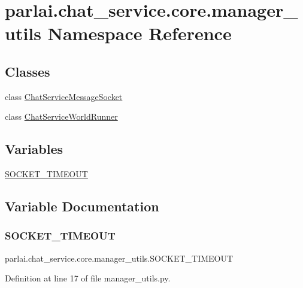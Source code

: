 \hypertarget{namespaceparlai_1_1chat__service_1_1core_1_1manager__utils}{}\section{parlai.\+chat\+\_\+service.\+core.\+manager\+\_\+utils Namespace Reference}
\label{namespaceparlai_1_1chat__service_1_1core_1_1manager__utils}
\subsection*{Classes}
\begin{DoxyCompactItemize}
\item 
class \hyperlink{classparlai_1_1chat__service_1_1core_1_1manager__utils_1_1ChatServiceMessageSocket}{Chat\+Service\+Message\+Socket}
\item 
class \hyperlink{classparlai_1_1chat__service_1_1core_1_1manager__utils_1_1ChatServiceWorldRunner}{Chat\+Service\+World\+Runner}
\end{DoxyCompactItemize}
\subsection*{Variables}
\begin{DoxyCompactItemize}
\item 
\hyperlink{namespaceparlai_1_1chat__service_1_1core_1_1manager__utils_adff143c45cb7348b01f0e004538185ca}{S\+O\+C\+K\+E\+T\+\_\+\+T\+I\+M\+E\+O\+UT}
\end{DoxyCompactItemize}


\subsection{Variable Documentation}
\mbox{\label{namespaceparlai_1_1chat__service_1_1core_1_1manager__utils_adff143c45cb7348b01f0e004538185ca}} 
\subsubsection{\texorpdfstring{S\+O\+C\+K\+E\+T\+\_\+\+T\+I\+M\+E\+O\+UT}{SOCKET\_TIMEOUT}}
{\footnotesize\ttfamily parlai.\+chat\+\_\+service.\+core.\+manager\+\_\+utils.\+S\+O\+C\+K\+E\+T\+\_\+\+T\+I\+M\+E\+O\+UT}



Definition at line 17 of file manager\+\_\+utils.\+py.

